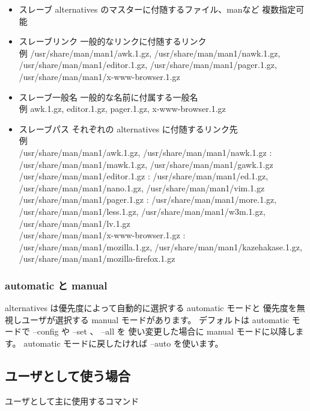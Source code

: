 \documentclass[mingoth]{jsarticle}
\begin{document}
\begin{itemize}
 \item 

     スレーブ  alternatives のマスターに付随するファイル、manなど 複数指定可能\\
 \item      スレーブリンク 一般的なリンクに付随するリンク\\
       例 /usr/share/man/man1/awk.1.gz, /usr/share/man/man1/nawk.1.gz, /usr/share/man/man1/editor.1.gz, /usr/share/man/man1/pager.1.gz, /usr/share/man/man1/x-www-browser.1.gz
 \item      スレーブ一般名 一般的な名前に付属する一般名\\
       例 awk.1.gz, editor.1.gz, pager.1.gz, x-www-browser.1.gz
 \item      スレーブパス それぞれの alternatives に付随するリンク先\\
       例 \\ /usr/share/man/man1/awk.1.gz, /usr/share/man/man1/nawk.1.gz : /usr/share/man/man1/mawk.1.gz, /usr/share/man/man1/gawk.1.gz\\
          /usr/share/man/man1/editor.1.gz : /usr/share/man/man1/ed.1.gz, /usr/share/man/man1/nano.1.gz, /usr/share/man/man1/vim.1.gz\\
          /usr/share/man/man1/pager.1.gz : /usr/share/man/man1/more.1.gz, /usr/share/man/man1/less.1.gz, /usr/share/man/man1/w3m.1.gz, /usr/share/man/man1/lv.1.gz\\
          /usr/share/man/man1/x-www-browser.1.gz : /usr/share/man/man1/mozilla.1.gz, /usr/share/man/man1/kazehakase.1.gz, /usr/share/man/man1/mozilla-firefox.1.gz\\
\end{itemize}

\subsubsection{automatic と manual }

        alternatives は優先度によって自動的に選択する automatic モードと
        優先度を無視しユーザが選択する manual モードがあります。 
        デフォルトは automatic モードで --config や --set 、 --all を
        使い変更した場合に manual モードに以降します。
        automatic モードに戻したければ --auto を使います。

\subsection{ユーザとして使う場合}
     ユーザとして主に使用するコマンド
\end{document}
